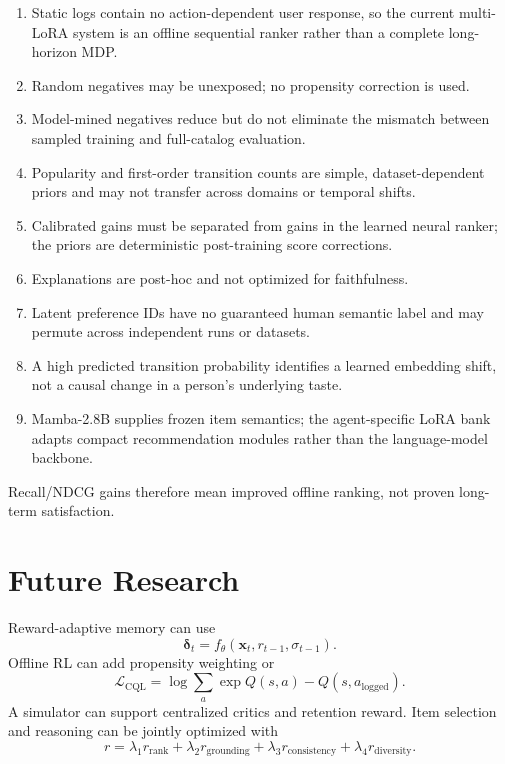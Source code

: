 \documentclass[11pt,a4paper]{article}
\begin{document}
\begin{enumerate}
  \item Static logs contain no action-dependent user response, so the current
  multi-LoRA system is an offline sequential ranker rather than a complete
  long-horizon MDP.
  \item Random negatives may be unexposed; no propensity correction is used.
  \item Model-mined negatives reduce but do not eliminate the mismatch between
  sampled training and full-catalog evaluation.
  \item Popularity and first-order transition counts are simple, dataset-dependent priors and may not transfer across domains or temporal shifts.
  \item Calibrated gains must be separated from gains in the learned neural ranker; the priors are deterministic post-training score corrections.
  \item Explanations are post-hoc and not optimized for faithfulness.
  \item Latent preference IDs have no guaranteed human semantic label and may
  permute across independent runs or datasets.
  \item A high predicted transition probability identifies a learned embedding
  shift, not a causal change in a person's underlying taste.
  \item Mamba-2.8B supplies frozen item semantics; the agent-specific LoRA bank
  adapts compact recommendation modules rather than the language-model backbone.
\end{enumerate}

Recall/NDCG gains therefore mean improved offline ranking, not proven long-term satisfaction.

\section{Future Research}

Reward-adaptive memory can use
\begin{equation}
  \bm\delta_t=f_\theta(\bm x_t,r_{t-1},\sigma_{t-1}).
\end{equation}
Offline RL can add propensity weighting or
\begin{equation}
  \mathcal L_{\mathrm{CQL}}
  =
  \log\sum_a\exp Q(s,a)-Q(s,a_{\mathrm{logged}}).
\end{equation}
A simulator can support centralized critics and retention reward. Item selection and reasoning can be jointly optimized with
\begin{equation}
  r=
  \lambda_1r_{\mathrm{rank}}
  +\lambda_2r_{\mathrm{grounding}}
  +\lambda_3r_{\mathrm{consistency}}
  +\lambda_4r_{\mathrm{diversity}}.
\end{equation}
\end{document}
